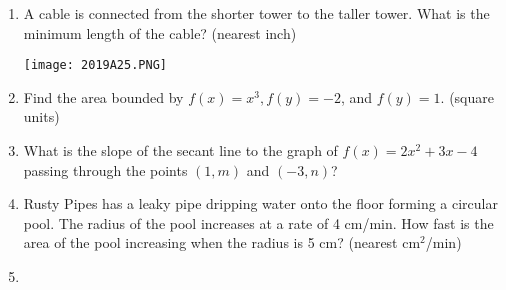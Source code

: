 \documentclass[../uilmath.tex]{subfiles}
\begin{document}
\begin{enumerate}[label=\bfseries\arabic*.]
    \item %
    A cable is connected from the shorter tower to the taller tower. What is the minimum length of the cable? (nearest inch)
    \begin{center}
        \texttt{[image: 2019A25.PNG]}
    \end{center}

    \item %
    Find the area bounded by $f(x)=x^3, f(y)=-2$, and $f(y)=1$. (square units)

    \item %
    What is the slope of the secant line to the graph of $f(x)=2x^2+3x-4$ passing through the points $(1,m)$ and $(-3,n)$?

    \item %
    Rusty Pipes has a leaky pipe dripping water onto the floor forming a circular pool. The radius of the pool increases at a rate of 4 cm/min.
    How fast is the area of the pool increasing when the radius is 5 cm? (nearest cm$^2$/min)

    \item %
    
    
\end{enumerate}
\end{document}
